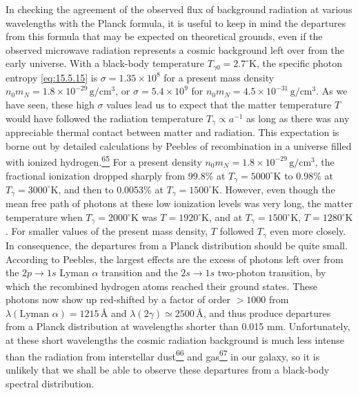 In checking the agreement of the observed flux of background radiation at
various wavelengths with the Planck formula, it is useful to keep in mind the
departures from this formula that may be expected on theoretical grounds, even
if the observed microwave radiation represents a cosmic background left over
from the early universe. With a black-body temperature
\(T_{\gamma0}=2.7^\circ\mathrm{K}\), the specific photon entropy
\eqref{eq:15.5.15} is \(\sigma=1.35\times10^8\) for a present mass density
\(n_0m_N=1.8\times10^{-29}\,\mathrm{g/cm^3}\), or
\(\sigma=5.4\times10^9\) for
\(n_0m_N=4.5\times10^{-31}\,\mathrm{g/cm^3}\). As we have seen, these high
\(\sigma\) values lead us to expect that the matter temperature \(T\) would
have followed the radiation temperature \(T_\gamma\propto a^{-1}\) as long as
there was any appreciable thermal contact between matter and radiation. This
expectation is borne out by detailed calculations by Peebles of recombination
in a universe filled with ionized
hydrogen.\hyperref[ch15-ref-65]{\textsuperscript{65}} For a present density
\(n_0m_N=1.8\times10^{-29}\,\mathrm{g/cm^3}\), the fractional ionization
dropped sharply from 99.8\% at \(T_\gamma=5000^\circ\mathrm{K}\) to 0.98\%
at \(T_\gamma=3000^\circ\mathrm{K}\), and then to 0.0053\% at
\(T_\gamma=1500^\circ\mathrm{K}\). However, even though the mean free path of
photons at these low ionization levels was very long, the matter temperature
when \(T_\gamma=2000^\circ\mathrm{K}\) was \(T=1920^\circ\mathrm{K}\), and
at \(T_\gamma=1500^\circ\mathrm{K}\), \(T=1280^\circ\mathrm{K}\). For
smaller values of the present mass density, \(T\) followed \(T_\gamma\) even
more closely. In consequence, the departures from a Planck distribution should
be quite small. According to Peebles, the largest effects are the excess of
photons left over from the \(2p\to1s\) Lyman \(\alpha\) transition and the
\(2s\to1s\) two-photon transition, by which the recombined hydrogen atoms
reached their ground states. These photons now show up red-shifted by a factor
of order \(>1000\) from
\(\lambda(\text{Lyman }\alpha)=1215\,\text{\AA}\) and
\(\lambda(2\gamma)\simeq2500\,\text{\AA}\), and thus produce departures from
a Planck distribution at wavelengths shorter than 0.015 mm. Unfortunately, at
these short wavelengths the cosmic radiation background is much less intense
than the radiation from interstellar
dust\hyperref[ch15-ref-66]{\textsuperscript{66}} and
gas\hyperref[ch15-ref-67]{\textsuperscript{67}} in our galaxy, so it is
unlikely that we shall be able to observe these departures from a black-body
spectral distribution.

